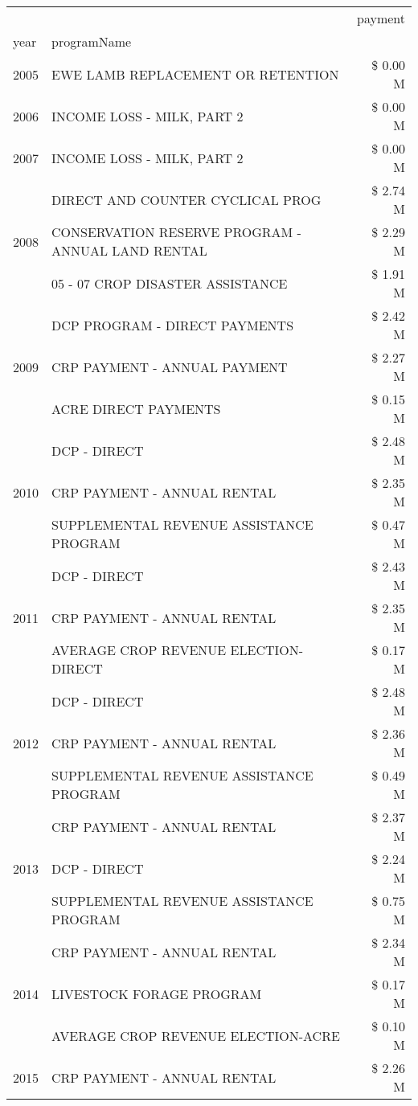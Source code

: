 \begin{tabular}{llr}
\toprule
 &  & payment \\
year & programName &  \\
\midrule
2005 & EWE LAMB REPLACEMENT OR RETENTION & \$ 0.00 M \\
\cline{1-3}
2006 & INCOME LOSS - MILK, PART 2 & \$ 0.00 M \\
\cline{1-3}
2007 & INCOME LOSS - MILK, PART 2 & \$ 0.00 M \\
\cline{1-3}
\multirow[t]{3}{*}{2008} & DIRECT AND COUNTER CYCLICAL PROG & \$ 2.74 M \\
 & CONSERVATION RESERVE PROGRAM - ANNUAL LAND RENTAL & \$ 2.29 M \\
 & 05 - 07 CROP DISASTER ASSISTANCE & \$ 1.91 M \\
\cline{1-3}
\multirow[t]{3}{*}{2009} & DCP PROGRAM - DIRECT PAYMENTS & \$ 2.42 M \\
 & CRP PAYMENT - ANNUAL PAYMENT & \$ 2.27 M \\
 & ACRE DIRECT PAYMENTS & \$ 0.15 M \\
\cline{1-3}
\multirow[t]{3}{*}{2010} & DCP - DIRECT & \$ 2.48 M \\
 & CRP PAYMENT - ANNUAL RENTAL & \$ 2.35 M \\
 & SUPPLEMENTAL REVENUE ASSISTANCE PROGRAM & \$ 0.47 M \\
\cline{1-3}
\multirow[t]{3}{*}{2011} & DCP - DIRECT & \$ 2.43 M \\
 & CRP PAYMENT - ANNUAL RENTAL & \$ 2.35 M \\
 & AVERAGE CROP REVENUE ELECTION-DIRECT & \$ 0.17 M \\
\cline{1-3}
\multirow[t]{3}{*}{2012} & DCP - DIRECT & \$ 2.48 M \\
 & CRP PAYMENT - ANNUAL RENTAL & \$ 2.36 M \\
 & SUPPLEMENTAL REVENUE ASSISTANCE PROGRAM & \$ 0.49 M \\
\cline{1-3}
\multirow[t]{3}{*}{2013} & CRP PAYMENT - ANNUAL RENTAL & \$ 2.37 M \\
 & DCP - DIRECT & \$ 2.24 M \\
 & SUPPLEMENTAL REVENUE ASSISTANCE PROGRAM & \$ 0.75 M \\
\cline{1-3}
\multirow[t]{3}{*}{2014} & CRP PAYMENT - ANNUAL RENTAL & \$ 2.34 M \\
 & LIVESTOCK FORAGE PROGRAM & \$ 0.17 M \\
 & AVERAGE CROP REVENUE ELECTION-ACRE & \$ 0.10 M \\
\cline{1-3}
\multirow[t]{3}{*}{2015} & CRP PAYMENT - ANNUAL RENTAL & \$ 2.26 M \\

\end{tabular}
